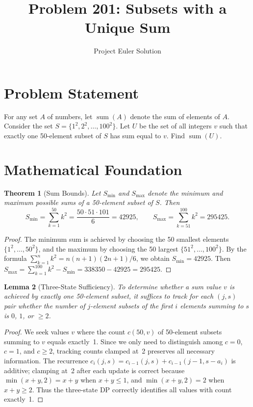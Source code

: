 \documentclass[12pt]{article}
\title{Problem 201: Subsets with a Unique Sum}
\author{Project Euler Solution}
\date{}
\newtheorem{theorem}{Theorem}
\newtheorem{lemma}[theorem]{Lemma}
\begin{document}
\maketitle

\section{Problem Statement}
For any set $A$ of numbers, let $\operatorname{sum}(A)$ denote the sum of elements of $A$.
Consider the set $S = \{1^2, 2^2, \ldots, 100^2\}$. Let $U$ be the set of all integers $v$
such that exactly one 50-element subset of $S$ has sum equal to $v$. Find $\operatorname{sum}(U)$.

\section{Mathematical Foundation}

\begin{theorem}[Sum Bounds]
Let $S_{\min}$ and $S_{\max}$ denote the minimum and maximum possible sums of a 50-element
subset of $S$. Then
\[
S_{\min} = \sum_{k=1}^{50} k^2 = \frac{50 \cdot 51 \cdot 101}{6} = 42925, \qquad
S_{\max} = \sum_{k=51}^{100} k^2 = 295425.
\]
\end{theorem}

\begin{proof}
The minimum sum is achieved by choosing the 50 smallest elements $\{1^2, \ldots, 50^2\}$,
and the maximum by choosing the 50 largest $\{51^2, \ldots, 100^2\}$. By the formula
$\sum_{k=1}^{n} k^2 = n(n+1)(2n+1)/6$, we obtain $S_{\min} = 42925$. Then
$S_{\max} = \sum_{k=1}^{100} k^2 - S_{\min} = 338350 - 42925 = 295425$.
\end{proof}

\begin{lemma}[Three-State Sufficiency]
To determine whether a sum value $v$ is achieved by exactly one 50-element subset, it
suffices to track for each $(j, s)$ pair whether the number of $j$-element subsets of the
first $i$ elements summing to $s$ is $0$, $1$, or $\geq 2$.
\end{lemma}

\begin{proof}
We seek values $v$ where the count $c(50, v)$ of 50-element subsets summing to $v$ equals
exactly~1. Since we only need to distinguish among $c = 0$, $c = 1$, and $c \geq 2$,
tracking counts clamped at~2 preserves all necessary information. The recurrence
$c_i(j,s) = c_{i-1}(j,s) + c_{i-1}(j-1, s - a_i)$ is additive; clamping at~2 after each
update is correct because $\min(x+y, 2) = x+y$ when $x+y \leq 1$, and
$\min(x+y, 2) = 2$ when $x+y \geq 2$. Thus the three-state DP correctly identifies all
values with count exactly~1.
\end{proof}
\end{document}
